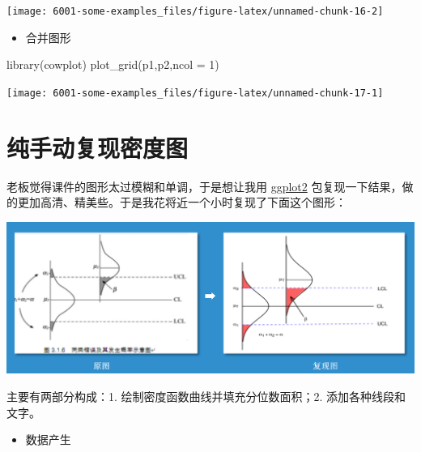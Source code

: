 \documentclass[
]{book}
\newenvironment{Shaded}{\begin{snugshade}}{\end{snugshade}}
\newcommand{\AttributeTok}[1]{\textcolor[rgb]{0.77,0.63,0.00}{#1}}
\newcommand{\DecValTok}[1]{\textcolor[rgb]{0.00,0.00,0.81}{#1}}
\newcommand{\FunctionTok}[1]{\textcolor[rgb]{0.00,0.00,0.00}{#1}}
\newcommand{\NormalTok}[1]{#1}
\providecommand{\tightlist}{%
  \setlength{\itemsep}{0pt}\setlength{\parskip}{0pt}}
\begin{document}
\begin{center}\texttt{[image: 6001-some-examples\_files/figure-latex/unnamed-chunk-16-2]} \end{center}

\begin{itemize}
\tightlist
\item
  合并图形
\end{itemize}

\begin{Shaded}
\begin{Highlighting}[]
\FunctionTok{library}\NormalTok{(cowplot)}
\FunctionTok{plot\_grid}\NormalTok{(p1,p2,}\AttributeTok{ncol =} \DecValTok{1}\NormalTok{)}
\end{Highlighting}
\end{Shaded}

\begin{center}\texttt{[image: 6001-some-examples\_files/figure-latex/unnamed-chunk-17-1]} \end{center}

\hypertarget{ux7eafux624bux52a8ux590dux73b0ux5bc6ux5ea6ux56fe}{%
\section{纯手动复现密度图}\label{ux7eafux624bux52a8ux590dux73b0ux5bc6ux5ea6ux56fe}}

老板觉得课件的图形太过模糊和单调，于是想让我用 \href{https://ggplot2.tidyverse.org/}{ggplot2} 包复现一下结果，做的更加高清、精美些。于是我花将近一个小时复现了下面这个图形：

\includegraphics{images/paste-224B4B25.png}

主要有两部分构成：1. 绘制密度函数曲线并填充分位数面积；2. 添加各种线段和文字。

\begin{itemize}
\tightlist
\item
  数据产生
\end{itemize}
\end{document}
